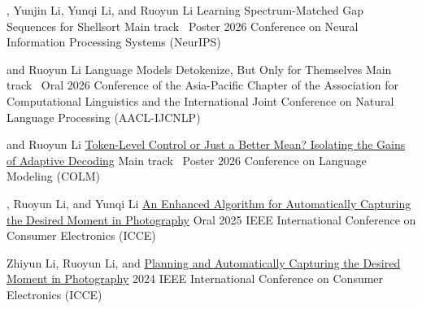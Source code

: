 
\begin{cventries}
  \cventry
    {\myname, Yunjin Li, Yunqi Li, and Ruoyun Li}
    {Learning Spectrum-Matched Gap Sequences for Shellsort}
    {Main track \textbullet\ Poster}
    {2026}
    {Conference on Neural Information Processing Systems (NeurIPS)}

  \cventry
    {\myname{} and Ruoyun Li}
    {Language Models Detokenize, But Only for Themselves}
    {Main track \textbullet\ Oral}
    {2026}
    {Conference of the Asia-Pacific Chapter of the Association for Computational Linguistics and the International Joint Conference on Natural Language Processing (AACL-IJCNLP)}

  \cventry
    {\myname{} and Ruoyun Li}
    {\href{https://openreview.net/forum?id=EGz8InJz6F}{Token-Level Control or Just a Better Mean? Isolating the Gains of Adaptive Decoding}}
    {Main track \textbullet\ Poster}
    {2026}
    {Conference on Language Modeling (COLM)}

  \cventry
    {\myname, Ruoyun Li, and Yunqi Li}
    {\href{https://doi.org/10.1109/ICCE63647.2025.10930158}{An Enhanced Algorithm for Automatically Capturing the Desired Moment in Photography}}
    {Oral}
    {2025}
    {IEEE International Conference on Consumer Electronics (ICCE)}

  \cventry
    {Zhiyun Li, Ruoyun Li, and \myname}
    {\href{https://doi.org/10.1109/ICCE59016.2024.10444255}{Planning and Automatically Capturing the Desired Moment in Photography}}
    {}
    {2024}
    {IEEE International Conference on Consumer Electronics (ICCE)}
\end{cventries}

